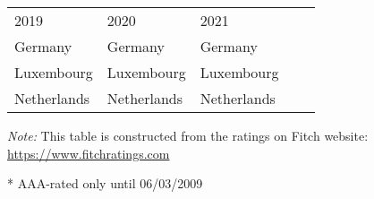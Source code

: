 \begin{table}[!ht]
\begin{adjustbox}{width=0.65\textwidth}
\begin{threeparttable}
\begin{tabular}[t]{lllll}
 &  &  &  & \\
\midrule
2019 & 2020 & 2021 &  & \\
\midrule
Germany & Germany & Germany &  & \\
Luxembourg & Luxembourg & Luxembourg &  & \\
Netherlands & Netherlands & Netherlands &  & \\
\bottomrule
\end{tabular}
\begin{tablenotes}\footnotesize
    \item\textit{Note:} This table is constructed from the ratings on Fitch website: \url{https://www.fitchratings.com}
    \item[*] AAA-rated only until 06/03/2009
\end{tablenotes}
\end{threeparttable}
\end{adjustbox}
\end{table}
